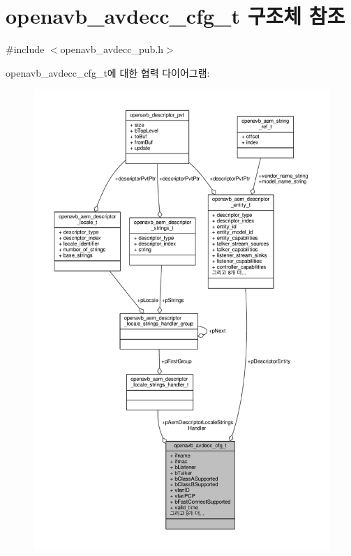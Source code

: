 \hypertarget{structopenavb__avdecc__cfg__t}{}\section{openavb\+\_\+avdecc\+\_\+cfg\+\_\+t 구조체 참조}
\label{structopenavb__avdecc__cfg__t}


{\ttfamily \#include $<$openavb\+\_\+avdecc\+\_\+pub.\+h$>$}



openavb\+\_\+avdecc\+\_\+cfg\+\_\+t에 대한 협력 다이어그램\+:
\nopagebreak
\begin{figure}[H]
\begin{center}
\leavevmode
\includegraphics[width=350pt]{structopenavb__avdecc__cfg__t__coll__graph}
\end{center}
\end{figure}

